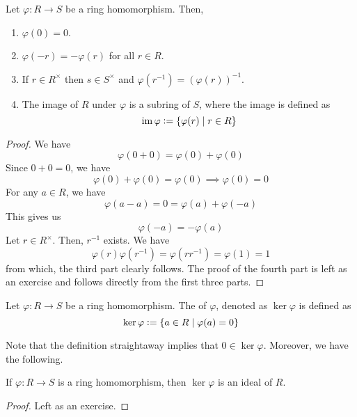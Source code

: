 \begin{prop}
    Let $\varphi \colon R \to S$ be a ring homomorphism. Then,
    \begin{enumerate}
        \item $\varphi(0) = 0$.
        \item $\varphi(-r) = -\varphi(r)$ for all $r \in R$.
        \item If $r \in R^{\times}$ then $s \in S^{\times}$ and $\varphi(r^{-1}) = (\varphi(r))^{-1}$.
        \item The image of $R$ under $\varphi$ is a subring of $S$, where the image is defined as
        \[
            \operatorname{im}\varphi \vcentcolon= \left\{ \varphi(r) \mid r \in R \right\}
        \]
    \end{enumerate}
\end{prop}
\begin{proof}
    We have
    \[
        \varphi(0 + 0) = \varphi(0) + \varphi(0)
    \]
    Since $0 + 0 = 0$, we have
    \[
        \varphi(0) + \varphi(0) = \varphi(0) \implies \varphi(0) = 0
    \]
    For any $a \in R$, we have
    \[
        \varphi(a - a) = 0 = \varphi(a) + \varphi(-a)
    \]
    This gives us
    \[
        \varphi(-a) = -\varphi(a)
    \]
    Let $r \in R^{\times}$. Then, $r^{-1}$ exists. We have
    \[
        \varphi(r) \varphi(r^{-1}) = \varphi(r r^{-1}) = \varphi(1) = 1
    \]
    from which, the third part clearly follows.
    The proof of the fourth part is left as an exercise and follows directly from the first three parts.
\end{proof}

\begin{defn}[Kernel]
    Let $\varphi \colon R \to S$ be a ring homomorphism. The  of $\varphi$, denoted as $\ker\varphi$ is defined as 
    \[
        \ker\varphi \vcentcolon= \left\{ a \in R \mid \varphi(a) = 0 \right\}
    \]
\end{defn}

Note that the definition straightaway implies that $0 \in \ker\varphi$. Moreover, we have the following.
\begin{prop} \label{prop:kernel-is-ideal}
    If $\varphi \colon R \to S$ is a ring homomorphism, then $\ker\varphi$ is an ideal of $R$.
\end{prop}
\begin{proof}
    Left as an exercise.
\end{proof}

